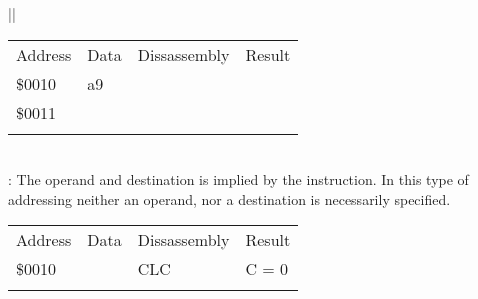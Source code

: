 \documentclass[letterpaper,10pt,english]{sphinxmanual}
\begin{document}
\begin{savenotes}
\begin{tabular}[t]{|*{1}{|}}
\begin{savenotes}\sphinxattablestart
\sphinxthistablewithglobalstyle
\centering
\begin{tabulary}{\linewidth}[t]{|T|T|T|T|}
\sphinxtoprule
\sphinxstyletheadfamily 
\sphinxAtStartPar
Address
&\sphinxstyletheadfamily 
\sphinxAtStartPar
Data
&\sphinxstyletheadfamily 
\sphinxAtStartPar
Dissassembly
&\sphinxstyletheadfamily 
\sphinxAtStartPar
Result
\\
\sphinxmidrule
\sphinxtableatstartofbodyhook
\sphinxAtStartPar
\$0010
&
\sphinxAtStartPar
a9
&%
&%
\\
\sphinxAtStartPar
\$0011
&
&&\\
\sphinxbottomrule
\end{tabulary}
\sphinxtableafterendhook\par
\sphinxattableend\end{savenotes}
\\
\sphinxhline
\sphinxAtStartPar
{}: The operand and destination is implied
by the instruction. In this type of addressing neither an operand, nor
a destination is necessarily specified.
\begin{quote}

\sphinxAtStartPar
{}
\end{quote}


\begin{savenotes}\sphinxattablestart
\sphinxthistablewithglobalstyle
\centering
\begin{tabulary}{\linewidth}[t]{|T|T|T|T|}
\sphinxtoprule
\sphinxstyletheadfamily 
\sphinxAtStartPar
Address
&\sphinxstyletheadfamily 
\sphinxAtStartPar
Data
&\sphinxstyletheadfamily 
\sphinxAtStartPar
Dissassembly
&\sphinxstyletheadfamily 
\sphinxAtStartPar
Result
\\
\sphinxmidrule
\sphinxtableatstartofbodyhook
\sphinxAtStartPar
\$0010
&
&
\sphinxAtStartPar
CLC
&
\sphinxAtStartPar
C = 0
\\
\sphinxbottomrule
\end{tabulary}
\sphinxtableafterendhook\par
\sphinxattableend\end{savenotes}
\\
\sphinxbottomrule
\end{tabular}
\sphinxtableafterendhook\par
\sphinxattableend\end{savenotes}
\end{document}
